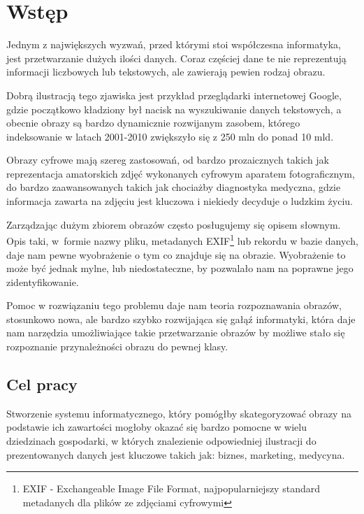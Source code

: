 \chapter*{Wstęp}

Jednym z największych wyzwań, przed którymi stoi współczesna informatyka, jest przetwarzanie dużych ilości danych. Coraz częściej dane te nie reprezentują informacji liczbowych lub tekstowych, ale zawierają pewien rodzaj obrazu. 

Dobrą ilustracją tego zjawiska jest przykład przeglądarki internetowej Google, gdzie początkowo kładziony był nacisk na wyszukiwanie danych tekstowych, a obecnie obrazy są bardzo dynamicznie rozwijanym zasobem, którego indeksowanie w latach 2001-2010 zwiększyło się z 250 mln do ponad 10 mld.\cite{Google2010} 

Obrazy cyfrowe mają szereg zastosowań, od bardzo prozaicznych takich jak reprezentacja amatorskich zdjęć wykonanych cyfrowym aparatem fotograficznym, do bardzo zaawansowanych takich jak chociażby diagnostyka medyczna, gdzie informacja zawarta na zdjęciu jest kluczowa i niekiedy decyduje o ludzkim życiu.

Zarządzając dużym zbiorem obrazów często posługujemy się opisem słownym. Opis taki, w~formie nazwy pliku, metadanych EXIF\footnote{EXIF - Exchangeable Image File Format, najpopularniejszy standard metadanych dla plików ze zdjęciami cyfrowymi} lub rekordu w bazie danych, daje nam pewne wyobrażenie o tym co znajduje się na obrazie. Wyobrażenie to może być jednak mylne, lub niedostateczne, by pozwalało nam na poprawne jego zidentyfikowanie.

Pomoc w rozwiązaniu tego problemu daje nam teoria rozpoznawania obrazów, stosunkowo nowa, ale bardzo szybko rozwijająca się gałąź informatyki, która daje nam narzędzia umożliwiające takie przetwarzanie obrazów by możliwe stało się rozpoznanie przynależności obrazu do pewnej klasy.\cite{Tad91}


\section*{Cel pracy}

Stworzenie systemu informatycznego, który pomógłby skategoryzować obrazy na podstawie ich zawartości mogłoby okazać się bardzo pomocne w wielu dziedzinach gospodarki, w których znalezienie odpowiedniej ilustracji do prezentowanych danych jest kluczowe takich jak: biznes, marketing, medycyna.

